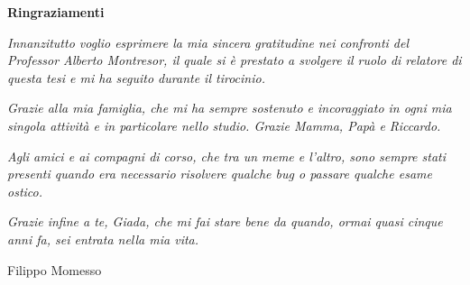 \thispagestyle{empty}

\begin{center}
  {\bf \Huge Ringraziamenti}
\end{center}

\vspace{4cm}

\textit{
  Innanzitutto voglio esprimere la mia sincera gratitudine nei confronti del Professor Alberto Montresor, il quale si è prestato a svolgere il ruolo di relatore di questa tesi e mi ha seguito durante il tirocinio.}

\textit{
  Grazie alla mia famiglia, che mi ha sempre sostenuto e incoraggiato in ogni mia singola attività e in particolare nello studio. Grazie Mamma, Papà e Riccardo.}


\textit{  
  Agli amici e ai compagni di corso, che tra un meme e l'altro, sono sempre stati presenti quando era necessario risolvere qualche bug o passare qualche esame ostico.}

\textit{  
  Grazie infine a te, Giada, che mi fai stare bene da quando, ormai quasi cinque anni fa, sei entrata nella mia vita.
}
\vspace{2 cm} 
\begin{flushright}
  Filippo Momesso
\end{flushright} 

\newpage
\thispagestyle{plain} %
\mbox{}